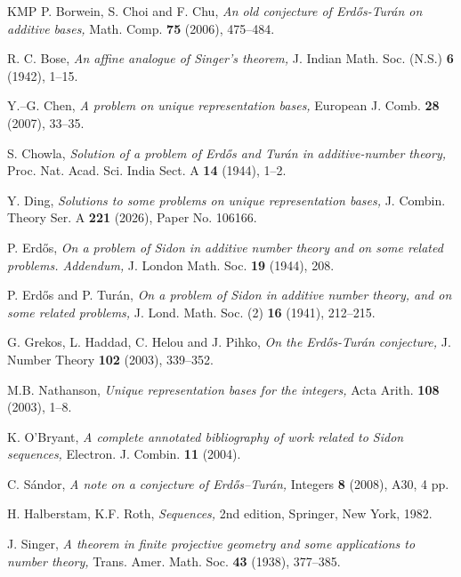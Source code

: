 \documentclass[12pt,a4paper,reqno]{amsart}
\numberwithin{equation}{section}
\theoremstyle{plain}
\theoremstyle{definition}
\begin{document}
\begin{thebibliography}{KMP}
P. Borwein, S. Choi and F. Chu, {\it An old conjecture of Erd\H os-Tur\'an on additive bases,} Math. Comp. {\bf75} (2006), 475--484. 

R. C. Bose, {\it An affine analogue of Singer’s theorem,} J. Indian Math. Soc. (N.S.) {\bf6} (1942),
1--15.

Y.--G. Chen, {\it A problem on unique representation bases,}  European J. Comb. {\bf28} (2007), 33--35. 

S. Chowla, {\it Solution of a problem of Erd\H os and Tur\'{a}n in additive-number theory,} Proc. Nat. Acad. Sci. India Sect. A {\bf14} (1944), 1--2.

Y. Ding, {\it Solutions to some problems on unique representation bases,}  J. Combin. Theory Ser. A {\bf 221} (2026), Paper No. 106166.

 P. Erd\H os,  {\it On a problem of Sidon in additive number theory and on some related problems. Addendum,} J. London Math. Soc. {\bf19} (1944), 208.

P. Erd\H os and P. Tur\'an, {\it On a problem of Sidon in additive number theory, and on some related problems,} J. Lond. Math. Soc. (2) {\bf 16} (1941), 212--215.

G. Grekos, L. Haddad, C. Helou and J. Pihko, {\it On the Erd\H os-Tur\'an conjecture,} J. Number Theory {\bf102} (2003), 339--352.

M.B. Nathanson, {\it Unique representation bases for the integers,} Acta Arith.  {\bf 108} (2003), 1--8.

K. O'Bryant, {\it A complete annotated bibliography of work related to Sidon sequences,} Electron. J. Combin. {\bf 11} (2004). 

C. S\'{a}ndor, {\it A note on a conjecture of Erd\H os--Tur\'{a}n,} Integers {\bf8} (2008), A30, 4 pp.

H. Halberstam, K.F. Roth, {\it Sequences,} 2nd edition, Springer, New York, 1982.

J. Singer, {\it A theorem in finite projective geometry and some applications to number theory,} Trans. Amer. Math. Soc. {\bf43} (1938), 377--385.

\end{thebibliography}
\end{document}
